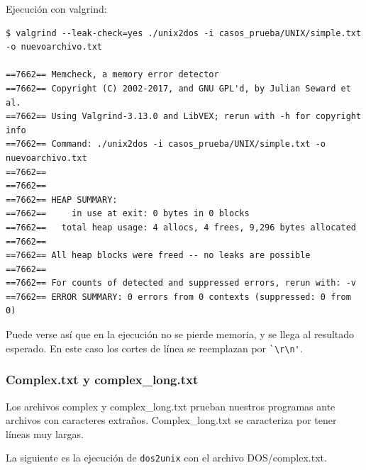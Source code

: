 \documentclass[a4paper,10pt, spanish]{article}
\begin{document}
Ejecución con valgrind:
\begin{lstlisting}
$ valgrind --leak-check=yes ./unix2dos -i casos_prueba/UNIX/simple.txt -o nuevoarchivo.txt

==7662== Memcheck, a memory error detector
==7662== Copyright (C) 2002-2017, and GNU GPL'd, by Julian Seward et al.
==7662== Using Valgrind-3.13.0 and LibVEX; rerun with -h for copyright info
==7662== Command: ./unix2dos -i casos_prueba/UNIX/simple.txt -o nuevoarchivo.txt
==7662== 
==7662== 
==7662== HEAP SUMMARY:
==7662==     in use at exit: 0 bytes in 0 blocks
==7662==   total heap usage: 4 allocs, 4 frees, 9,296 bytes allocated
==7662== 
==7662== All heap blocks were freed -- no leaks are possible
==7662== 
==7662== For counts of detected and suppressed errors, rerun with: -v
==7662== ERROR SUMMARY: 0 errors from 0 contexts (suppressed: 0 from 0)
\end{lstlisting}

Puede verse así que en la ejecución no se pierde memoria, y se llega al resultado esperado.
En este caso los cortes de línea se reemplazan por \lstinline{`\r\n'}.

\subsubsection{Complex.txt y complex\_long.txt}

Los archivos complex y complex\_long.txt prueban nuestros programas ante archivos con caracteres
extraños. Complex\_long.txt se caracteriza por tener líneas muy largas.

La siguiente es la ejecución de \lstinline{dos2unix} con el archivo DOS/complex.txt. 
\end{document}
